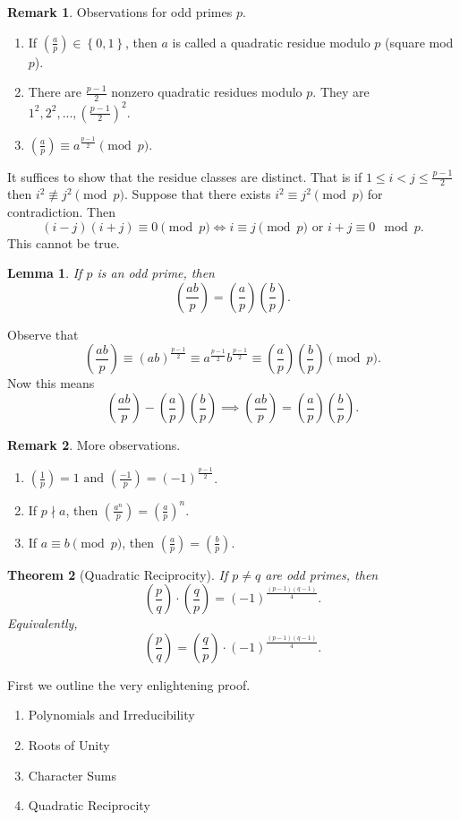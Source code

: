 \documentclass[11pt]{article}
\newtheorem{thm}{Theorem}[section]
\newtheorem{lemma}[thm]{Lemma}
\theoremstyle{definition}
\newtheorem{remark}{Remark}[section]
\newcommand{\legendre}[2]{\left(\frac{#1}{#2}\right)}
\newcommand{\set}[1]{\left\{ #1 \right\}}
\newcommand{\et}[0]{\text{ and }}
\begin{document}
\begin{remark}
	Observations for odd primes $p$.
	\begin{enumerate}
		\item If $\legendre{a}{p} \in \set{0,1}$, then $a$ is called a quadratic residue modulo $p$ (square mod $p$). 
		\item There are $\frac{p-1}{2}$ nonzero quadratic residues modulo $p$. They are $1^2, 2^2, ... , (\frac{p-1}{2})^2$. 
		\item $\legendre{a}{p} \equiv a^{\frac{p-1}{2}} \pmod{p}$. 
	\end{enumerate}
\end{remark}
	It suffices to show that the residue classes are distinct. 
	That is if $1 \le i < j \le \frac{p-1}{2}$ then $i^2 \not\equiv j^2 \pmod{p}$. 
	Suppose that there exists $i^2 \equiv j^2 \pmod{p}$ for contradiction.
	Then 
	$$ (i-j)(i+j) \equiv 0 \pmod{p} \iff i \equiv j \pmod{p} \text{ or } i+j \equiv 0 \mod{p}. $$
	This cannot be true. 
\qedhere

\begin{lemma}
	If $p$ is an odd prime, then 
	$$ \legendre{ab}{p} = \legendre{a}{p}\legendre{b}{p} . $$
\end{lemma}
\proof
	Observe that 
	$$ \legendre{ab}{p} \equiv (ab)^\frac{p-1}{2} \equiv a^\frac{p-1}{2} b^\frac{p-1}{2} \equiv \legendre{a}{p}\legendre{b}{p} \pmod{p}. $$
	Now this means 
	$$ \legendre{ab}{p} - \legendre{a}{p}\legendre{b}{p} \implies \legendre{ab}{p} = \legendre{a}{p}\legendre{b}{p}. $$
\qedhere

\begin{remark}
	More observations. 
	\begin{enumerate}
		\item $\legendre{1}{p} = 1 \et \legendre{-1}{p} = (-1)^\frac{p-1}{2}$.
		\item If $p\nmid a$, then $\legendre{a^n}{p} = \legendre{a}{p}^n$.
		\item If $a\equiv b \pmod{p}$, then $\legendre{a}{p} = \legendre{b}{p}$. 
	\end{enumerate}
\end{remark}

\begin{thm}[Quadratic Reciprocity]
	If $p\neq q$ are odd primes, then
	$$ \legendre{p}{q} \cdot \legendre{q}{p} = (-1)^{\frac{(p-1)(q-1)}{4}} . $$
	Equivalently, 
	$$ \legendre{p}{q} = \legendre{q}{p} \cdot (-1)^{\frac{(p-1)(q-1)}{4}} . $$
\end{thm}
\proof First we outline the very enlightening proof.
\begin{enumerate}
	\item Polynomials and Irreducibility
	\item Roots of Unity
	\item Character Sums
	\item Quadratic Reciprocity
\end{enumerate}
\qedhere
\end{document}
